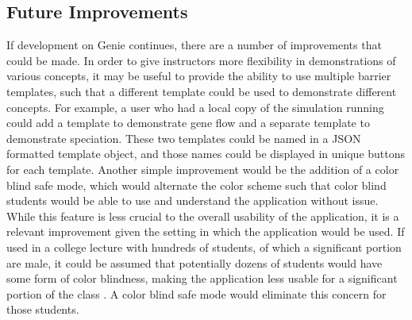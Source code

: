\documentclass[12pt]{article}
\begin{document}
\begin{spacing}{1.5}
\subsection{Future Improvements}
If development on Genie continues, there are a number of improvements that could be made. In order to give instructors more flexibility in demonstrations of various concepts, it may be useful to provide the ability to use multiple barrier templates, such that a different template could be used to demonstrate different concepts. For example, a user who had a local copy of the simulation running could add a template to demonstrate gene flow and a separate template to demonstrate speciation. These two templates could be named in a JSON formatted template object, and those names could be displayed in unique buttons for each template.\newline
\newline
Another simple improvement would be the addition of a color blind safe mode, which would alternate the color scheme such that color blind students would be able to use and understand the application without issue. While this feature is less crucial to the overall usability of the application, it is a relevant improvement given the setting in which the application would be used. If used in a college lecture with hundreds of students, of which a significant portion are male, it could be assumed that potentially dozens of students would have some form of color blindness, making the application less usable for a significant portion of the class \cite{colorblind}. A color blind safe mode would eliminate this concern for those students.


\end{spacing}
\end{document}

